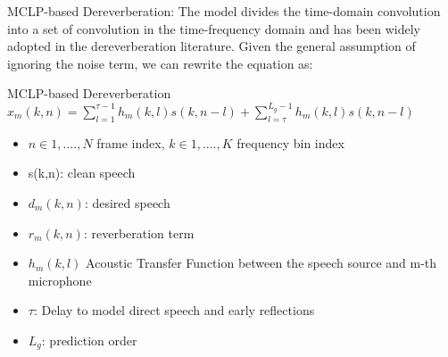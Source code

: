\documentclass{beamer}
\begin{document}
\begin{frame}{MCLP-based Dereverberation:}
The model divides the time-domain convolution into a set of convolution in the time-frequency domain
and has been widely adopted in the dereverberation literature.
Given the general assumption of ignoring the noise term, we can rewrite the equation as: \newline


    
\end{frame}
\begin{frame}{MCLP-based Dereverberation}
$x_m(k,n)=
\sum_{l=1}^{\tau-1}h_m(k,l)s(k,n-l) +
\sum_{l=\tau}^{L_g-1}h_m(k,l)s(k,n-l)
$ \newline
\begin{itemize}
    \item $n\in {1,....,N}$ frame index, $k \in {1,....,K}$ frequency bin index 
    \item s(k,n): clean speech
    \item $d_m(k,n)$: desired speech
    \item $r_m(k,n)$: reverberation term
    \item $h_m(k,l)$ Acoustic Transfer Function between the speech source and m-th microphone
    \item $\tau$: Delay to model direct speech and early reflections
    \item $L_g$: prediction order
\end{itemize}
    

    
\end{frame}
\end{document}
